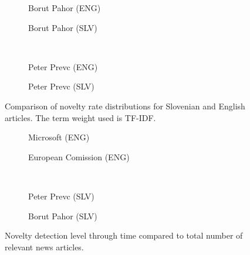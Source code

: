 \documentclass{acm_proc_article-sp}
\begin{document}
\begin{figure}[!htb]
  \begin{subfigure}{.5\textwidth}
    \centering
    \caption{Borut Pahor (ENG)}
    \label{fig:lfig1}
  \end{subfigure}%
  \begin{subfigure}{.5\textwidth}
    \centering
    \caption{Borut Pahor (SLV)}
    \label{fig:lfig2}
  \end{subfigure}%
  \\
   \begin{subfigure}{.5\textwidth}
    \centering
    \caption{Peter Prevc (ENG)}
    \label{fig:lfig3}
  \end{subfigure}%
  \begin{subfigure}{.5\textwidth}
    \centering
    \caption{Peter Prevc (SLV)}
    \label{fig:lfig4}
  \end{subfigure}%
\caption{Comparison of novelty rate distributions for Slovenian and English articles. The term weight used is TF-IDF.}
\label{fig:histogram-language}
\end{figure}

\begin{figure}[!htb]
  \begin{subfigure}{.5\textwidth}
    \centering
    \caption{Microsoft (ENG)}
    \label{fig:rfig1}
  \end{subfigure}%
  \begin{subfigure}{.5\textwidth}
    \centering
    \caption{European Comission (ENG)}
    \label{fig:rfig2}
  \end{subfigure}%
  \\
   \begin{subfigure}{.5\textwidth}
    \centering
    \caption{Peter Prevc (SLV)}
    \label{fig:rfig3}
  \end{subfigure}%
  \begin{subfigure}{.5\textwidth}
    \centering
    \caption{Borut Pahor (SLV)}
    \label{fig:rfig4}
  \end{subfigure}%
\caption{Novelty detection level through time compared to total number of relevant news articles.}
\label{fig:timelines}
\end{figure}

\text{  }
\end{document}
